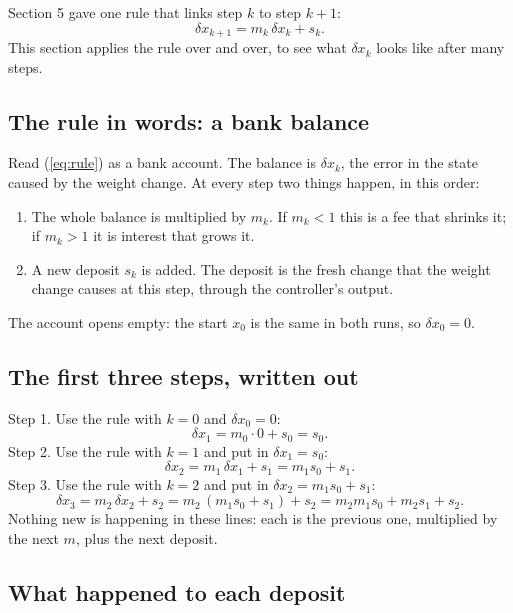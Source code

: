 \documentclass[11pt]{article}
\begin{document}
Section 5 gave one rule that links step $k$ to step $k+1$:
\begin{equation}\label{eq:rule}
\delta x_{k+1}=m_k\,\delta x_k+s_k .
\end{equation}
This section applies the rule over and over, to see what $\delta x_k$ looks like after many steps.

\subsection{The rule in words: a bank balance}

Read (\ref{eq:rule}) as a bank account. The balance is $\delta x_k$, the error in the state caused by the weight change. At every step two things happen, in this order:
\begin{enumerate}
\item The whole balance is multiplied by $m_k$. If $m_k<1$ this is a fee that shrinks it; if $m_k>1$ it is interest that grows it.
\item A new deposit $s_k$ is added. The deposit is the fresh change that the weight change causes at this step, through the controller's output.
\end{enumerate}
The account opens empty: the start $x_0$ is the same in both runs, so $\delta x_0=0$.

\subsection{The first three steps, written out}

Step 1. Use the rule with $k=0$ and $\delta x_0=0$:
\begin{equation}
\delta x_1=m_0\cdot0+s_0=s_0 .
\end{equation}
Step 2. Use the rule with $k=1$ and put in $\delta x_1=s_0$:
\begin{equation}
\delta x_2=m_1\,\delta x_1+s_1=m_1 s_0+s_1 .
\end{equation}
Step 3. Use the rule with $k=2$ and put in $\delta x_2=m_1 s_0+s_1$:
\begin{equation}
\delta x_3=m_2\,\delta x_2+s_2=m_2\,(m_1 s_0+s_1)+s_2=m_2 m_1 s_0+m_2 s_1+s_2 .
\end{equation}
Nothing new is happening in these lines: each is the previous one, multiplied by the next $m$, plus the next deposit.

\subsection{What happened to each deposit}
\end{document}
